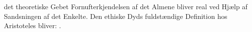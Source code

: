 det theoretiske Gebet Fornufterkjendelsen af det Almene bliver
real ved Hjælp af Sandsningen af det Enkelte. Den ethiske
Dyds fuldstændige Definition hos Aristoteles bliver: .

